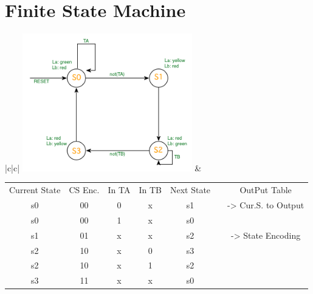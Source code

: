 
\section*{Finite State Machine}

\begin{tabular}{|c|c|}
\hline 
\includegraphics[height=6cm]{DT/img/fsm} & %
\begin{tabular}{|c|c|c|c|c|cc}
\cline{1-5} \cline{7-7} 
Current State & CS Enc. & In TA & In TB & Next State & \multicolumn{1}{c|}{} & \multicolumn{1}{c|}{OutPut Table}\tabularnewline
\cline{1-5} \cline{7-7} 
s0 & 00 & 0 & x & s1 & \multicolumn{1}{c|}{} & \multicolumn{1}{c|}{-> Cur.S. to Output}\tabularnewline
\cline{1-5} \cline{7-7} 
s0 & 00 & 1 & x & s0 &  & \tabularnewline
\cline{1-5} \cline{7-7} 
s1 & 01 & x & x & s2 & \multicolumn{1}{c|}{} & \multicolumn{1}{c|}{-> State Encoding}\tabularnewline
\cline{1-5} \cline{7-7} 
s2 & 10 & x & 0 & s3 &  & \tabularnewline
\cline{1-5} 
s2 & 10 & x & 1 & s2 &  & \tabularnewline
\cline{1-5} 
s3 & 11 & x & x & s0 &  & \tabularnewline
\cline{1-5} 
\end{tabular}\tabularnewline
\hline 
\end{tabular}
